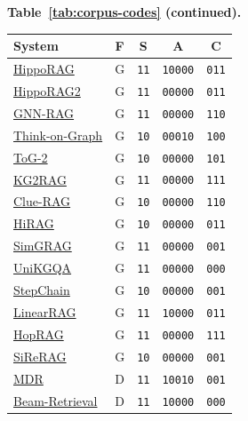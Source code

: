 \documentclass[11pt]{article}
\begin{document}
\newpage
\begin{center}
\footnotesize
\textbf{Table~\ref{tab:corpus-codes} (continued).}\\[0.4em]
\setlength{\tabcolsep}{4pt}
\begin{tabular}{@{}lcccc@{}}
\toprule
\textbf{System} & \textbf{F} & \textbf{S} & \textbf{A} & \textbf{C} \\
\midrule
\href{https://arxiv.org/abs/2405.14831}{HippoRAG} & G & \texttt{11} & \texttt{10000} & \texttt{011} \\
\href{https://arxiv.org/abs/2502.14802}{HippoRAG2} & G & \texttt{11} & \texttt{00000} & \texttt{011} \\
\href{https://arxiv.org/abs/2405.20139}{GNN-RAG} & G & \texttt{11} & \texttt{00000} & \texttt{110} \\
\href{https://arxiv.org/abs/2307.07697}{Think-on-Graph} & G & \texttt{10} & \texttt{00010} & \texttt{100} \\
\href{https://arxiv.org/abs/2407.10805}{ToG-2} & G & \texttt{10} & \texttt{00000} & \texttt{101} \\
\href{https://aclanthology.org/2025.naacl-long.449/}{KG2RAG} & G & \texttt{11} & \texttt{00000} & \texttt{111} \\
\href{https://arxiv.org/abs/2507.08445}{Clue-RAG} & G & \texttt{10} & \texttt{00000} & \texttt{110} \\
\href{https://arxiv.org/abs/2503.10150}{HiRAG} & G & \texttt{10} & \texttt{00000} & \texttt{011} \\
\href{https://arxiv.org/abs/2412.15272}{SimGRAG} & G & \texttt{11} & \texttt{00000} & \texttt{001} \\
\href{https://arxiv.org/abs/2212.00959}{UniKGQA} & G & \texttt{11} & \texttt{00000} & \texttt{000} \\
\href{https://arxiv.org/abs/2510.02827}{StepChain} & G & \texttt{10} & \texttt{00000} & \texttt{001} \\
\href{https://arxiv.org/abs/2510.10114}{LinearRAG} & G & \texttt{11} & \texttt{10000} & \texttt{011} \\
\href{https://arxiv.org/abs/2502.12442}{HopRAG} & G & \texttt{11} & \texttt{00000} & \texttt{111} \\
\href{https://arxiv.org/abs/2412.06206}{SiReRAG} & G & \texttt{10} & \texttt{00000} & \texttt{001} \\
\href{https://arxiv.org/abs/2009.12756}{MDR} & D & \texttt{11} & \texttt{10010} & \texttt{001} \\
\href{https://arxiv.org/abs/2308.08973}{Beam-Retrieval} & D & \texttt{11} & \texttt{10000} & \texttt{000} \\
\bottomrule
\end{tabular}


\end{center}
\end{document}
